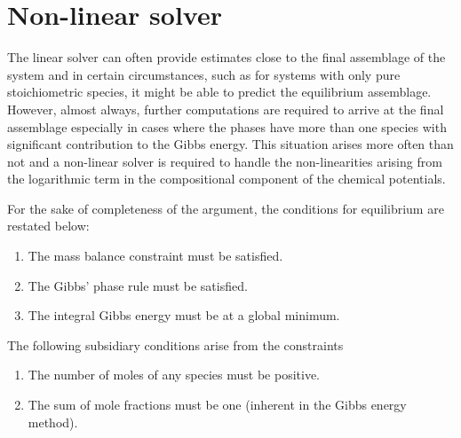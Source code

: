 \section{Non-linear solver}
	The linear solver can often provide estimates close to the final assemblage of the system and in certain circumstances, such as for systems with only pure 	stoichiometric species, it might be able to predict the equilibrium assemblage. However, almost always, further computations are required to arrive at the final assemblage especially in cases where the phases have more than one species with significant contribution to the Gibbs energy. This situation arises more often than not and a non-linear solver is required to handle the non-linearities arising from the logarithmic term in the compositional component of the chemical potentials.

	For the sake of completeness of the argument, the conditions for equilibrium are restated below:
	\begin{enumerate}
		\item The mass balance constraint must be satisfied.
		\item The Gibbs' phase rule must be satisfied.
		\item The integral Gibbs energy must be at a global minimum.
	\end{enumerate}

	The following subsidiary conditions arise from the constraints
	\begin{enumerate}[label=\Alph*.]
		\item The number of moles of any species must be positive.
		\item The sum of mole fractions must be one (inherent in the Gibbs energy method).
	\end{enumerate}
	
